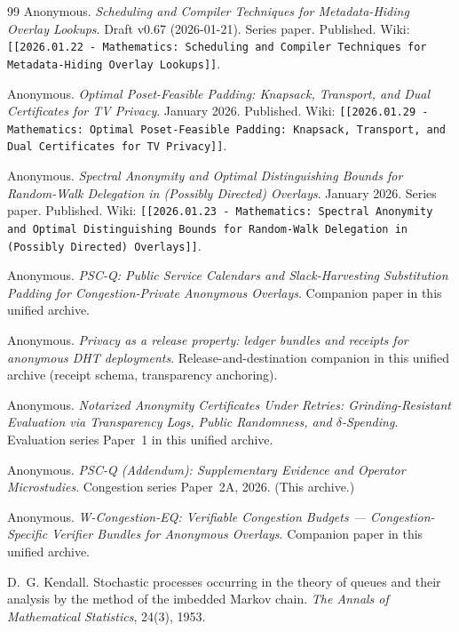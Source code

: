 \documentclass[11pt]{article}
\theoremstyle{definition}
\theoremstyle{remark}
\begin{document}
\begin{thebibliography}{99}
Anonymous.
\newblock \emph{Scheduling and Compiler Techniques for Metadata-Hiding Overlay Lookups}.
\newblock Draft v0.67 (2026-01-21). Series paper.
\newblock Published. Wiki: \texttt{[[2026.01.22 - Mathematics: Scheduling and Compiler Techniques for Metadata-Hiding Overlay Lookups]]}.

Anonymous.
\newblock \emph{Optimal Poset-Feasible Padding: Knapsack, Transport, and Dual Certificates for TV Privacy}.
\newblock January 2026. Published. Wiki: \texttt{[[2026.01.29 - Mathematics: Optimal Poset-Feasible Padding: Knapsack, Transport, and Dual Certificates for TV Privacy]]}.

Anonymous.
\newblock \emph{Spectral Anonymity and Optimal Distinguishing Bounds for Random-Walk Delegation in (Possibly Directed) Overlays}.
\newblock January 2026. Series paper.
\newblock Published. Wiki: \texttt{[[2026.01.23 - Mathematics: Spectral Anonymity and Optimal Distinguishing Bounds for Random-Walk Delegation in (Possibly Directed) Overlays]]}.

Anonymous.
\newblock \emph{PSC-Q: Public Service Calendars and Slack-Harvesting Substitution Padding for Congestion-Private Anonymous Overlays}.
\newblock Companion paper in this unified archive.

Anonymous.
\newblock \emph{Privacy as a release property: ledger bundles and receipts for anonymous DHT deployments}.
\newblock Release-and-destination companion in this unified archive (receipt schema, transparency anchoring).

Anonymous.
\newblock \emph{Notarized Anonymity Certificates Under Retries: Grinding-Resistant Evaluation via Transparency Logs, Public Randomness, and $\delta$-Spending}.
\newblock Evaluation series Paper~1 in this unified archive.

Anonymous.
\newblock \emph{PSC-Q (Addendum): Supplementary Evidence and Operator Microstudies}.
\newblock Congestion series Paper~2A, 2026. (This archive.)

Anonymous.
\newblock \emph{W-Congestion-EQ: Verifiable Congestion Budgets --- Congestion-Specific Verifier Bundles for Anonymous Overlays}.
\newblock Companion paper in this unified archive.

D.~G. Kendall.
\newblock Stochastic processes occurring in the theory of queues and their analysis by the method of the imbedded Markov chain.
\newblock \emph{The Annals of Mathematical Statistics}, 24(3), 1953.


\end{thebibliography}
\end{document}
